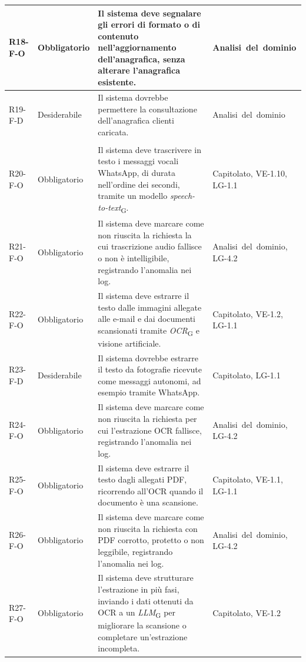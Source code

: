 {\begin{longtable}{|>{\raggedright\arraybackslash}p{1.8cm}|>{\raggedright\arraybackslash}p{2.3cm}|>{\raggedright\arraybackslash}p{6.6cm}|>{\raggedright\arraybackslash}p{3.1cm}|}
    \mbox{R18-F-O} & Obbligatorio & Il sistema deve segnalare gli errori di formato o di contenuto nell'aggiornamento dell'anagrafica, senza alterare l'anagrafica esistente. & \mbox{Analisi del dominio} \\ \hline
    \mbox{R19-F-D} & Desiderabile & Il sistema dovrebbe permettere la consultazione dell'anagrafica clienti caricata. & \mbox{Analisi del dominio} \\ \hline
    \multicolumn{4}{|l|}{\cellcolor[gray]{0.94}\textbf{Macroarea 3 --- Estrazione dei dati multimodale}} \\ \hline
    \mbox{R20-F-O} & Obbligatorio & Il sistema deve trascrivere in testo i messaggi vocali WhatsApp, di durata nell'ordine dei secondi, tramite un modello \textit{speech-to-text}\textsubscript{G}. & \mbox{Capitolato}, \mbox{VE-1.10}, \mbox{LG-1.1} \\ \hline
    \mbox{R21-F-O} & Obbligatorio & Il sistema deve marcare come non riuscita la richiesta la cui trascrizione audio fallisce o non è intelligibile, registrando l'anomalia nei log. & \mbox{Analisi del dominio}, \mbox{LG-4.2} \\ \hline
    \mbox{R22-F-O} & Obbligatorio & Il sistema deve estrarre il testo dalle immagini allegate alle e-mail e dai documenti scansionati tramite \textit{OCR}\textsubscript{G} e visione artificiale. & \mbox{Capitolato}, \mbox{VE-1.2}, \mbox{LG-1.1} \\ \hline
    \mbox{R23-F-D} & Desiderabile & Il sistema dovrebbe estrarre il testo da fotografie ricevute come messaggi autonomi, ad esempio tramite WhatsApp. & \mbox{Capitolato}, \mbox{LG-1.1} \\ \hline
    \mbox{R24-F-O} & Obbligatorio & Il sistema deve marcare come non riuscita la richiesta per cui l'estrazione OCR fallisce, registrando l'anomalia nei log. & \mbox{Analisi del dominio}, \mbox{LG-4.2} \\ \hline
    \mbox{R25-F-O} & Obbligatorio & Il sistema deve estrarre il testo dagli allegati PDF, ricorrendo all'OCR quando il documento è una scansione. & \mbox{Capitolato}, \mbox{VE-1.1}, \mbox{LG-1.1} \\ \hline
    \mbox{R26-F-O} & Obbligatorio & Il sistema deve marcare come non riuscita la richiesta con PDF corrotto, protetto o non leggibile, registrando l'anomalia nei log. & \mbox{Analisi del dominio}, \mbox{LG-4.2} \\ \hline
    \mbox{R27-F-O} & Obbligatorio & Il sistema deve strutturare l'estrazione in più fasi, inviando i dati ottenuti da OCR a un \textit{LLM}\textsubscript{G} per migliorare la scansione o completare un'estrazione incompleta. & \mbox{Capitolato}, \mbox{VE-1.2} \\ \hline

\end{longtable}}
